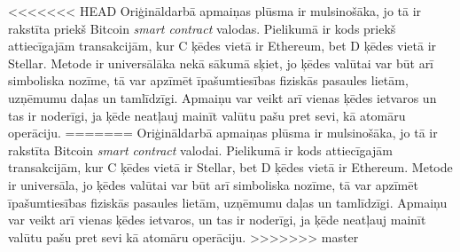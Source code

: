 <<<<<<< HEAD
Oriģināldarbā apmaiņas plūsma ir mulsinošāka, jo tā ir rakstīta priekš Bitcoin \textit{smart contract} valodas. Pielikumā ir kods priekš attiecīgajām transakcijām, kur C ķēdes vietā ir Ethereum, bet D ķēdes vietā ir Stellar.
Metode ir universālāka nekā sākumā sķiet, jo ķēdes valūtai var būt arī simboliska nozīme, tā var apzīmēt īpašumtiesības fiziskās pasaules lietām, uzņēmumu daļas un tamlīdzīgi.\cite{rosenfeld12}
Apmaiņu var veikt arī vienas ķēdes ietvaros un tas ir noderīgi, ja ķēde neatļauj mainīt valūtu pašu pret sevi, kā atomāru operāciju.
=======
Oriģināldarbā apmaiņas plūsma ir mulsinošāka, jo tā ir rakstīta Bitcoin \textit{smart contract} valodai. Pielikumā ir kods attiecīgajām transakcijām, kur C ķēdes vietā ir Stellar, bet D ķēdes vietā ir Ethereum.
Metode ir universāla, jo ķēdes valūtai var būt arī simboliska nozīme, tā var apzīmēt īpašumtiesības fiziskās pasaules lietām, uzņēmumu daļas un tamlīdzīgi.\cite{rosenfeld12}
Apmaiņu var veikt arī vienas ķēdes ietvaros, un tas ir noderīgi, ja ķēde neatļauj mainīt valūtu pašu pret sevi kā atomāru operāciju.
>>>>>>> master
